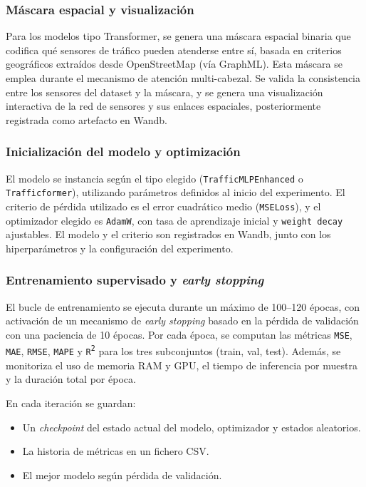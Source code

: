 \subsubsection*{Máscara espacial y visualización}  
Para los modelos tipo Transformer, se genera una máscara espacial binaria que codifica qué sensores de tráfico pueden atenderse entre sí, basada en criterios geográficos extraídos desde OpenStreetMap (vía GraphML). Esta máscara se emplea durante el mecanismo de atención multi-cabezal. Se valida la consistencia entre los sensores del dataset y la máscara, y se genera una visualización interactiva de la red de sensores y sus enlaces espaciales, posteriormente registrada como artefacto en Wandb.

\subsubsection*{Inicialización del modelo y optimización}  
El modelo se instancia según el tipo elegido (\texttt{TrafficMLPEnhanced} o \texttt{Trafficformer}), utilizando parámetros definidos al inicio del experimento. El criterio de pérdida utilizado es el error cuadrático medio (\texttt{MSELoss}), y el optimizador elegido es \texttt{AdamW}, con tasa de aprendizaje inicial y \texttt{weight decay} ajustables. El modelo y el criterio son registrados en Wandb, junto con los hiperparámetros y la configuración del experimento.

\subsubsection*{Entrenamiento supervisado y \textit{early stopping}}  
El bucle de entrenamiento se ejecuta durante un máximo de 100--120 épocas, con activación de un mecanismo de \textit{early stopping} basado en la pérdida de validación con una paciencia de 10 épocas. Por cada época, se computan las métricas \texttt{MSE}, \texttt{MAE}, \texttt{RMSE}, \texttt{MAPE} y \texttt{R\textsuperscript{2}} para los tres subconjuntos (train, val, test). Además, se monitoriza el uso de memoria RAM y GPU, el tiempo de inferencia por muestra y la duración total por época.

En cada iteración se guardan:

\begin{itemize}
	\item Un \textit{checkpoint} del estado actual del modelo, optimizador y estados aleatorios.
	\item La historia de métricas en un fichero CSV.
	\item El mejor modelo según pérdida de validación.
\end{itemize}

